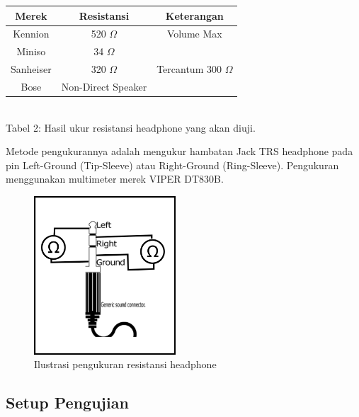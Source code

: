\documentclass[12pt,]{article}
\begin{document}
	\begin{center}
		\begin{tabular}{ |c|c|c| } 
			\hline
			Merek & Resistansi & Keterangan \\ 
			\hline
			Kennion & 520 $\Omega$ & Volume Max \\ 
			\hline
			Miniso & 34 $\Omega$ & \\ 
			\hline
			Sanheiser & 320 $\Omega$ & Tercantum 300 $\Omega$ \\ 
			\hline
			Bose & Non-Direct Speaker & \\ 
			\hline
		\end{tabular}\\
		\hfill \break
	Tabel 2: Hasil ukur resistansi headphone yang akan diuji.
	\end{center}
	
	Metode pengukurannya adalah mengukur hambatan Jack TRS headphone pada pin Left-Ground (Tip-Sleeve) atau Right-Ground (Ring-Sleeve).
	Pengukuran menggunakan multimeter merek VIPER DT830B.
	
	\begin{figure}[!ht]
		\centering
		\includegraphics[width=150pt]{images/ohmcheck}
		\caption{Ilustrasi pengukuran resistansi headphone}
	\end{figure}

	\subsection{Setup Pengujian}
	
\end{document}
